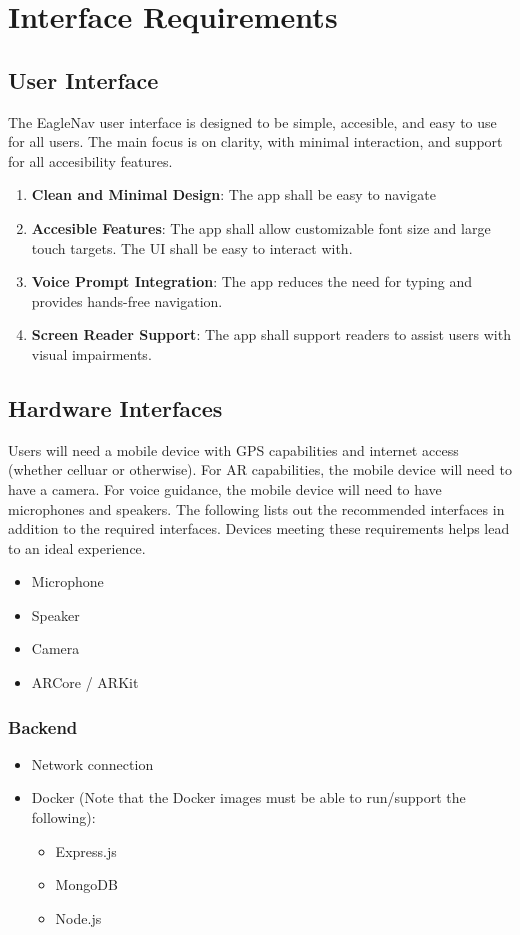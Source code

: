 \documentclass{article}
\begin{document}
\section{Interface Requirements}
\subsection{User Interface}
The EagleNav user interface is designed to be simple, accesible, and easy to use for all users. The main focus is on clarity,
with minimal interaction, and support for all accesibility features.

\begin{enumerate}
	\item \textbf{Clean and Minimal Design}: The app shall be easy to navigate
	\item \textbf{Accesible Features}: The app shall allow customizable font size and large touch targets. The UI shall be easy to interact with.
	\item \textbf{Voice Prompt Integration}: The app reduces the need for typing and provides hands-free navigation.
	\item \textbf{Screen Reader Support}: The app shall support readers to assist users with visual impairments.
\end{enumerate}

\subsection{Hardware Interfaces}
Users will need a mobile device with GPS capabilities and internet access (whether celluar or otherwise). For AR capabilities, the mobile device will need to have a camera. For voice guidance, the mobile device will need to have microphones and speakers.
The following lists out the recommended interfaces in addition to the required interfaces. Devices meeting these requirements helps lead to an ideal experience.
\begin{itemize}
\item{Microphone}
\item{Speaker}
\item{Camera}
\item{ARCore / ARKit}
\end{itemize}

\subsubsection{Backend}
\begin{itemize}
\item{Network connection}
\item{Docker (Note that the Docker images must be able to run/support the following):}
\begin{itemize}
	\item{Express.js}
	\item{MongoDB}
	\item{Node.js}
\end{itemize}
\end{itemize}
\end{document}
